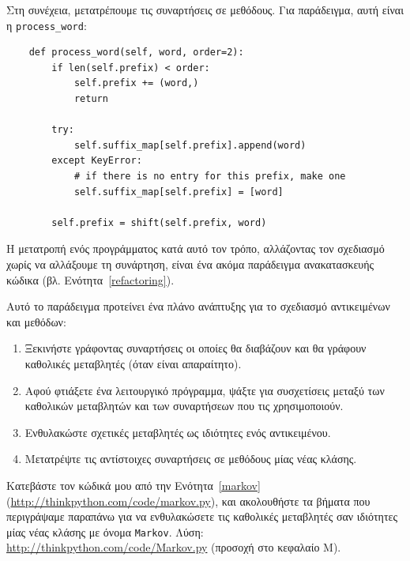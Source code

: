 \documentclass[10pt]{book}
\begin{document}
Στη συνέχεια, μετατρέπουμε τις συναρτήσεις σε μεθόδους. Για παράδειγμα, αυτή 
είναι η \verb"process_word":

\begin{verbatim}
    def process_word(self, word, order=2):
        if len(self.prefix) < order:
            self.prefix += (word,)
            return

        try:
            self.suffix_map[self.prefix].append(word)
        except KeyError:
            # if there is no entry for this prefix, make one
            self.suffix_map[self.prefix] = [word]

        self.prefix = shift(self.prefix, word)
\end{verbatim}

Η μετατροπή ενός προγράμματος κατά αυτό τον τρόπο, αλλάζοντας τον σχεδιασμό χωρίς να αλλάξουμε τη συνάρτηση,
είναι ένα ακόμα παράδειγμα ανακατασκευής κώδικα (βλ. Ενότητα~\ref{refactoring}).

Αυτό το παράδειγμα προτείνει ένα πλάνο ανάπτυξης για το σχεδιασμό αντικειμένων και μεθόδων:

\begin{enumerate}

 
\item Ξεκινήστε γράφοντας συναρτήσεις οι οποίες θα διαβάζουν και θα γράφουν καθολικές 
μεταβλητές (όταν είναι απαραίτητο).

\item Αφού φτιάξετε ένα λειτουργικό πρόγραμμα, ψάξτε για συσχετίσεις μεταξύ των καθολικών 
μεταβλητών και των συναρτήσεων που τις χρησιμοποιούν.

\item Ενθυλακώστε σχετικές μεταβλητές ως ιδιότητες ενός αντικειμένου.

\item Μετατρέψτε τις αντίστοιχες συναρτήσεις σε μεθόδους μίας νέας κλάσης.
\\

\end{enumerate}


\begin{exercise}

Κατεβάστε τον κώδικά μου από την Ενότητα~\ref{markov} (\url{http://thinkpython.com/code/markov.py}),
και ακολουθήστε τα βήματα που περιγράψαμε παραπάνω για να ενθυλακώσετε τις καθολικές μεταβλητές σαν
ιδιότητες μίας νέας κλάσης με όνομα {\tt Markov}.  Λύση: \url{http://thinkpython.com/code/Markov.py}
(προσοχή στο κεφαλαίο Μ).

\end{exercise}
\end{document}
